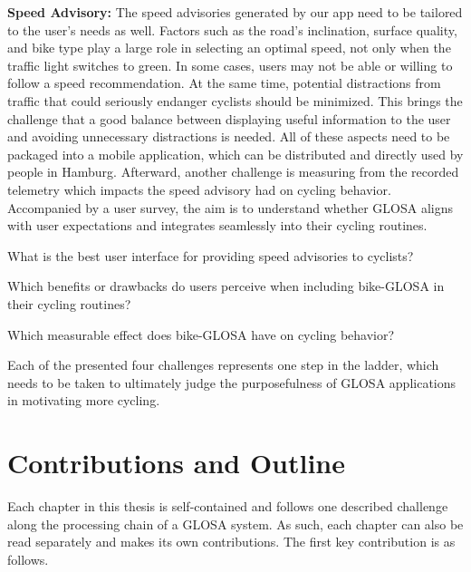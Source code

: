 \textbf{\color{cidarkblue}Speed Advisory:} The speed advisories generated by our app need to be tailored to the user's needs as well. Factors such as the road's inclination, surface quality, and bike type play a large role in selecting an optimal speed, not only when the traffic light switches to green. In some cases, users may not be able or willing to follow a speed recommendation. At the same time, potential distractions from traffic that could seriously endanger cyclists should be minimized. This brings the challenge that a good balance between displaying useful information to the user and avoiding unnecessary distractions is needed. All of these aspects need to be packaged into a mobile application, which can be distributed and directly used by people in Hamburg. Afterward, another challenge is measuring from the recorded telemetry which impacts the speed advisory had on cycling behavior. Accompanied by a user survey, the aim is to understand whether GLOSA aligns with user expectations and integrates seamlessly into their cycling routines.

\begin{researchquestion}
What is the best user interface for providing speed advisories to cyclists?
\end{researchquestion}
\begin{researchquestion}
Which benefits or drawbacks do users perceive when including bike-GLOSA in their cycling routines?
\end{researchquestion}
\begin{researchquestion}
Which measurable effect does bike-GLOSA have on cycling behavior?
\end{researchquestion}

Each of the presented four challenges represents one step in the ladder, which needs to be taken to ultimately judge the purposefulness of GLOSA applications in motivating more cycling.

\section{Contributions and Outline}

Each chapter in this thesis is self-contained and follows one described challenge along the processing chain of a GLOSA system. As such, each chapter can also be read separately and makes its own contributions. The first key contribution is as follows.

